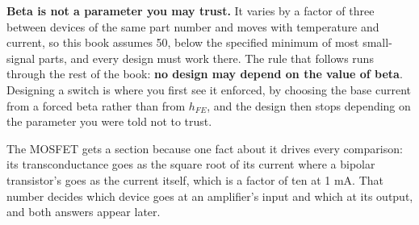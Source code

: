 \textbf{Beta is not a parameter you may trust.} It varies by a factor of three between devices of
the same part number and moves with temperature and current, so this book assumes 50, below the
specified minimum of most small-signal parts, and every design must work there. The rule that
follows runs through the rest of the book: \textbf{no design may depend on the value of beta}.
Designing a switch is where you first see it enforced, by choosing the base current from a forced
beta rather than from $h_{FE}$, and the design then stops depending on the parameter you were told
not to trust.

The MOSFET gets a section because one fact about it drives every comparison: its transconductance
goes as the square root of its current where a bipolar transistor's goes as the current itself,
which is a factor of ten at 1 mA. That number decides which device goes at an amplifier's input
and which at its output, and both answers appear later.





